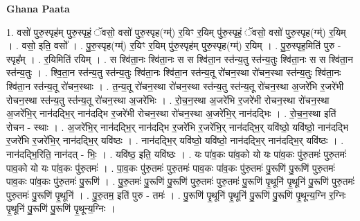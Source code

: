 \documentclass[17pt]{extarticle}
\begin{document}
\textbf{Ghana Paata } \newline

1. वसो॑ पुरु॒स्पृह॑म् पुरु॒स्पृहं॒ ॅवसो॒ वसो॑ पुरु॒स्पृह(ग्म्॑) र॒यिꣳ र॒यिम् पु॑रु॒स्पृहं॒ ॅवसो॒ वसो॑ पुरु॒स्पृह(ग्म्॑) र॒यिम् । . वसो॒ इति॒ वसो᳚ । . पु॒रु॒स्पृह(ग्म्॑) र॒यिꣳ र॒यिम् पु॑रु॒स्पृह॑म् पुरु॒स्पृह(ग्म्॑) र॒यिम् । . पु॒रु॒स्पृह॒मिति॑ पुरु - स्पृह᳚म् । . र॒यिमिति॑ रयिम् । . स श्वि॑ता॒नः श्वि॑ता॒नः स स श्वि॑ता॒न स्त॑न्य॒तु स्त॑न्य॒तुः श्वि॑ता॒नः स स श्वि॑ता॒न स्त॑न्य॒तुः । . श्वि॒ता॒न स्त॑न्य॒तु स्त॑न्य॒तुः श्वि॑ता॒नः श्वि॑ता॒न स्त॑न्य॒तू रो॑चन॒स्था रो॑चन॒स्था स्त॑न्य॒तुः श्वि॑ता॒नः श्वि॑ता॒न स्त॑न्य॒तू रो॑चन॒स्थाः । . त॒न्य॒तू रो॑चन॒स्था रो॑चन॒स्था स्त॑न्य॒तु स्त॑न्य॒तू रो॑चन॒स्था अ॒जरे॑भि र॒जरे॑भी रोचन॒स्था स्त॑न्य॒तु स्त॑न्य॒तू रो॑चन॒स्था अ॒जरे॑भिः । . रो॒च॒न॒स्था अ॒जरे॑भि र॒जरे॑भी रोचन॒स्था रो॑चन॒स्था अ॒जरे॑भि॒र् नान॑दद्भि॒र् नान॑दद्भि र॒जरे॑भी रोचन॒स्था रो॑चन॒स्था अ॒जरे॑भि॒र् नान॑दद्भिः । . रो॒च॒न॒स्था इति॑ रोचन - स्थाः । . अ॒जरे॑भि॒र् नान॑दद्भि॒र् नान॑दद्भि र॒जरे॑भि र॒जरे॑भि॒र् नान॑दद्भि॒र् यवि॑ष्ठो॒ यवि॑ष्ठो॒ नान॑दद्भि र॒जरे॑भि र॒जरे॑भि॒र् नान॑दद्भि॒र् यवि॑ष्ठः । . नान॑दद्भि॒र् यवि॑ष्ठो॒ यवि॑ष्ठो॒ नान॑दद्भि॒र् नान॑दद्भि॒र् यवि॑ष्ठः । . नान॑दद्भि॒रिति॒ नान॑दत् - भिः॒ । . यवि॑ष्ठ॒ इति॒ यवि॑ष्ठः । . यः पा॑व॒कः पा॑व॒को यो यः पा॑व॒कः पु॑रु॒तमः॑ पुरु॒तमः॑ पाव॒को यो यः पा॑व॒कः पु॑रु॒तमः॑ । . पा॒व॒कः पु॑रु॒तमः॑ पुरु॒तमः॑ पाव॒कः पा॑व॒कः पु॑रु॒तमः॑ पु॒रूणि॑ पु॒रूणि॑ पुरु॒तमः॑ पाव॒कः पा॑व॒कः पु॑रु॒तमः॑ पु॒रूणि॑ । . पु॒रु॒तमः॑ पु॒रूणि॑ पु॒रूणि॑ पुरु॒तमः॑ पुरु॒तमः॑ पु॒रूणि॑ पृ॒थूनि॑ पृ॒थूनि॑ पु॒रूणि॑ पुरु॒तमः॑ पुरु॒तमः॑ पु॒रूणि॑ पृ॒थूनि॑ । . पु॒रु॒तम॒ इति॑ पुरु - तमः॑ । . पु॒रूणि॑ पृ॒थूनि॑ पृ॒थूनि॑ पु॒रूणि॑ पु॒रूणि॑ पृ॒थून्य॒ग्नि र॒ग्निः पृ॒थूनि॑ पु॒रूणि॑ पु॒रूणि॑ पृ॒थून्य॒ग्निः । \newline
\end{document}
